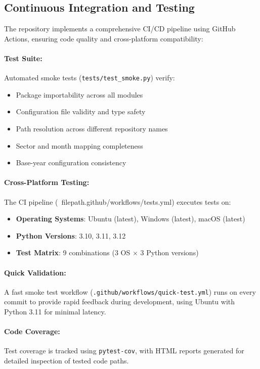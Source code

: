 \documentclass[a4paper, fleqn, 11pt]{article}
\newcommand{\filepath}[1]{\texttt{#1}}
\begin{document}
\subsection{Continuous Integration and Testing}

The repository implements a comprehensive CI/CD pipeline using GitHub Actions, ensuring code quality and cross-platform compatibility:

\paragraph{Test Suite:}
Automated smoke tests (\filepath{tests/test\_smoke.py}) verify:
\begin{itemize}
    \item Package importability across all modules
    \item Configuration file validity and type safety
    \item Path resolution across different repository names
    \item Sector and month mapping completeness
    \item Base-year configuration consistency
\end{itemize}

\paragraph{Cross-Platform Testing:}
The CI pipeline (\ filepath{.github/workflows/tests.yml}) executes tests on:
\begin{itemize}
    \item \textbf{Operating Systems}: Ubuntu (latest), Windows (latest), macOS (latest)
    \item \textbf{Python Versions}: 3.10, 3.11, 3.12
    \item \textbf{Test Matrix}: 9 combinations (3 OS $\times$ 3 Python versions)
\end{itemize}

\paragraph{Quick Validation:}
A fast smoke test workflow (\filepath{.github/workflows/quick-test.yml}) runs on every commit to provide rapid feedback during development, using Ubuntu with Python 3.11 for minimal latency.

\paragraph{Code Coverage:}
Test coverage is tracked using \texttt{pytest-cov}, with HTML reports generated for detailed inspection of tested code paths.
\end{document}

